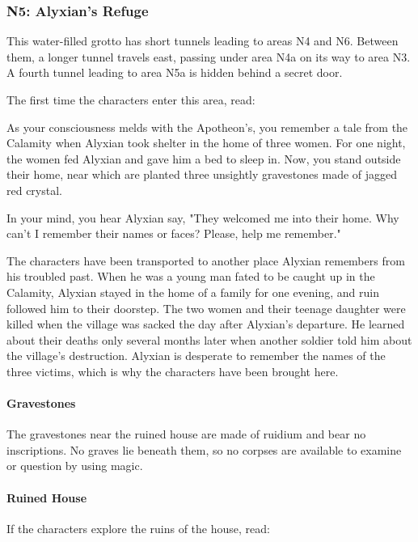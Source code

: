 \documentclass[10pt,a4paper,twoside,bg=print,twocolumn,openany,nodeprecatedcode]{dndbook}
\begin{document}
\subsubsection{N5: Alyxian's Refuge}
This water-filled grotto has short tunnels leading to areas N4 and N6. Between them, a longer tunnel travels east, passing under area N4a on its way to area N3. A fourth tunnel leading to area N5a is hidden behind a secret door.

The first time the characters enter this area, read:

\begin{DndReadAloud}{}
As your consciousness melds with the Apotheon's, you remember a tale from the Calamity when Alyxian took shelter in the home of three women. For one night, the women fed Alyxian and gave him a bed to sleep in. Now, you stand outside their home, near which are planted three unsightly gravestones made of jagged red crystal.

In your mind, you hear Alyxian say, "They welcomed me into their home. Why can't I remember their names or faces? Please, help me remember."

\end{DndReadAloud}

The characters have been transported to another place Alyxian remembers from his troubled past. When he was a young man fated to be caught up in the Calamity, Alyxian stayed in the home of a family for one evening, and ruin followed him to their doorstep. The two women and their teenage daughter were killed when the village was sacked the day after Alyxian's departure. He learned about their deaths only several months later when another soldier told him about the village's destruction. Alyxian is desperate to remember the names of the three victims, which is why the characters have been brought here.

\paragraph{Gravestones}
The gravestones near the ruined house are made of ruidium and bear no inscriptions. No graves lie beneath them, so no corpses are available to examine or question by using magic.

\paragraph{Ruined House}
If the characters explore the ruins of the house, read:
\end{document}
